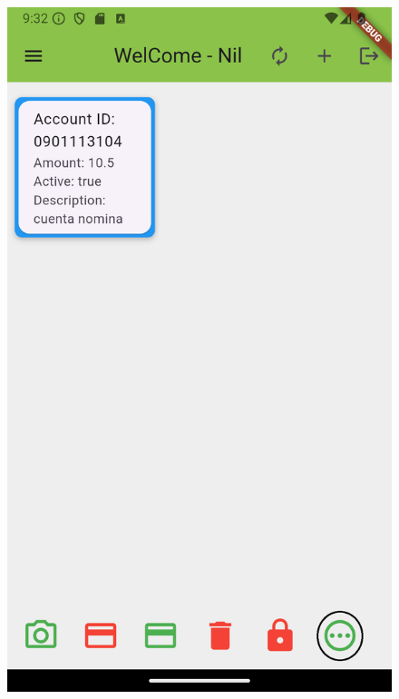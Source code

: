 \documentclass[a4paper,12pt,twoside]{ThesisStyle}
\begin{document}
\begin{figure}[h]
    \centering
    \begin{minipage}{0.30\textwidth}
        \centering
        \includegraphics[width=\textwidth]{imatges/mainpageAccount6.png}
    \end{minipage}
    \begin{minipage}{0.30\textwidth}
        \centering

\end{minipage}
\end{figure}
\end{document}
